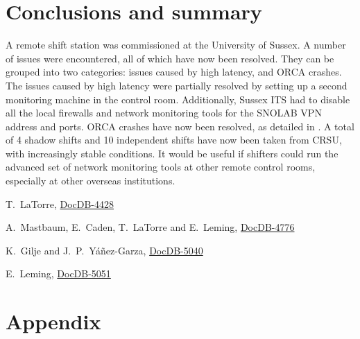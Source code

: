 \documentclass[a4paper,10pt]{article}
\newcommand{\docdb}[1]{\href{https://www.snolab.ca/snoplus/private/DocDB/cgi/ShowDocument?docid=#1}{DocDB-#1}} %
\begin{document}
\section{Conclusions and summary}
A remote shift station was commissioned at the University of Sussex.
A number of issues were encountered, all of which have now been resolved.
They can be grouped into two categories: issues caused by high latency, and ORCA crashes.
The issues caused by high latency were partially resolved by setting up a second monitoring machine in the control room.
Additionally, Sussex ITS had to disable all the local firewalls and network monitoring tools for the SNOLAB VPN address and ports.
ORCA crashes have now been resolved, as detailed in .
A total of 4 shadow shifts and 10 independent shifts have now been taken from CRSU, with increasingly stable conditions.
It would be useful if shifters could run the advanced set of network monitoring tools at other remote control rooms, especially at other overseas institutions.


\begin{thebibliography}{99}
T.~LaTorre, \docdb{4428}

A.~Mastbaum, E.~Caden, T.~LaTorre and E.~Leming, \docdb{4776}

K.~Gilje and J.~P.~Y\'{a}\~{n}ez-Garza, \docdb{5040}

E.~Leming, \docdb{5051}
\end{thebibliography}


\appendix
\section{Appendix}

\end{document}
